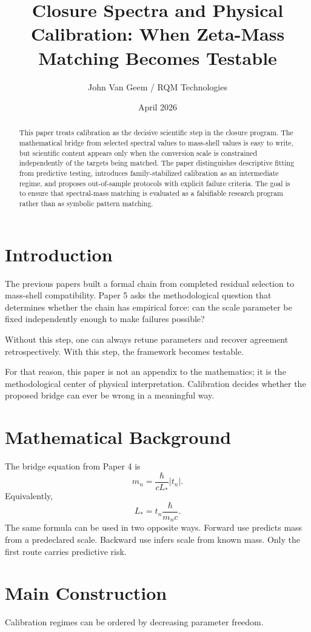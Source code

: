 \documentclass[11pt]{article}
\title{Closure Spectra and Physical Calibration: When Zeta-Mass Matching Becomes Testable}
\author{John Van Geem / RQM Technologies}
\date{April 2026}
\begin{document}
\maketitle

\begin{abstract}
This paper treats calibration as the decisive scientific step in the closure program. The mathematical bridge from selected spectral values to mass-shell values is easy to write, but scientific content appears only when the conversion scale is constrained independently of the targets being matched. The paper distinguishes descriptive fitting from predictive testing, introduces family-stabilized calibration as an intermediate regime, and proposes out-of-sample protocols with explicit failure criteria. The goal is to ensure that spectral-mass matching is evaluated as a falsifiable research program rather than as symbolic pattern matching.
\end{abstract}

\section{Introduction}
The previous papers built a formal chain from completed residual selection to mass-shell compatibility. Paper 5 asks the methodological question that determines whether the chain has empirical force: can the scale parameter be fixed independently enough to make failures possible?

Without this step, one can always retune parameters and recover agreement retrospectively. With this step, the framework becomes testable.

For that reason, this paper is not an appendix to the mathematics; it is the methodological center of physical interpretation. Calibration decides whether the proposed bridge can ever be wrong in a meaningful way.

\section{Mathematical Background}
The bridge equation from Paper 4 is
\[
m_n=\frac{\hbar}{cL_*}|t_n|.
\]
Equivalently,
\[
L_*=t_n\frac{\hbar}{m_nc}.
\]
The same formula can be used in two opposite ways. Forward use predicts mass from a predeclared scale. Backward use infers scale from known mass. Only the first route carries predictive risk.

\section{Main Construction}
Calibration regimes can be ordered by decreasing parameter freedom.
\end{document}
